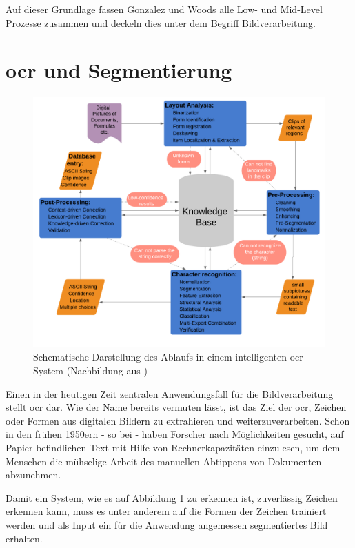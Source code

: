 		Auf dieser Grundlage fassen Gonzalez und Woods alle Low- und Mid-Level Prozesse zusammen und deckeln dies unter dem Begriff Bildverarbeitung.
	
	
	\section{\gls{ocr} und Segmentierung}
	
		\begin{figure}[H]
			\centering
			\includegraphics[width=\linewidth]{Ablauf-OCR_Cheriet-et-al.pdf}
			\caption[typisches \gls{ocr}-Ablaufschema]{Schematische Darstellung des 
				Ablaufs in einem intelligenten \gls{ocr}-System (Nachbildung aus 
				\cite[Seite 7]{cher-et-al-ocr})}
			\label{fig:ocr-system}
		\end{figure}
	
		Einen in der heutigen Zeit zentralen Anwendungsfall für die Bildverarbeitung stellt \gls{ocr} dar. Wie der Name bereits vermuten lässt, ist das Ziel der \gls{ocr}, Zeichen oder Formen aus digitalen Bildern zu extrahieren und weiterzuverarbeiten. Schon in den frühen 1950ern - so bei \cite{cher-et-al-ocr} - haben Forscher nach Möglichkeiten gesucht, auf Papier befindlichen Text mit Hilfe von Rechnerkapazitäten einzulesen, um dem Menschen die mühselige Arbeit des manuellen Abtippens von Dokumenten abzunehmen.

		Damit ein System, wie es auf Abbildung \ref{fig:ocr-system} zu 
		erkennen ist, zuverlässig Zeichen erkennen kann, muss es unter 
		anderem auf die Formen der Zeichen trainiert werden und als Input ein für 
		die Anwendung angemessen segmentiertes Bild erhalten. 
		